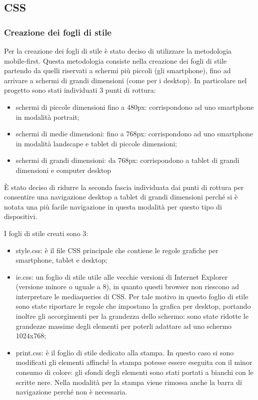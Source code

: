 \subsection{CSS}
\subsubsection{Creazione dei fogli di stile}

Per la creazione dei fogli di stile è stato deciso di utilizzare la metodologia mobile-first.
Questa metodologia consiste nella creazione dei fogli di stile partendo da quelli riservati a schermi più piccoli (gli smartphone), fino ad arrivare a schermi di grandi dimensioni (come per i desktop).
In particolare nel progetto sono stati individuati 3 punti di rottura:
\begin{itemize}

    \item schermi di piccole dimensioni fino a 480px: corrispondono ad uno smartphone in modalità portrait;
    \item schermi di medie dimensioni: fino a 768px: corrispondono ad uno smartphone in modalità landscape e tablet di piccole dimensioni;
    \item schermi di grandi dimensioni: da 768px: corrispondono a tablet di grandi dimensioni e computer desktop

\end{itemize}

\`E stato deciso di ridurre la seconda fascia individuata dai punti di rottura per consentire una navigazione desktop a tablet di grandi dimensioni perché si è notata una più facile navigazione in questa modalità per questo tipo di dispositivi.

I fogli di stile creati sono 3:
\begin{itemize}

    \item style.css: è il file CSS principale che contiene le regole grafiche per smartphone, tablet e desktop;
    \item ie.css:  un foglio di stile utile alle vecchie versioni di Internet Explorer (versione minore o uguale a 8), in quanto questi browser non riescono ad interpretare le mediaqueries di CSS. Per tale motivo in questo foglio di stile sono state riportare le regole che impostano la grafica per desktop, portando inoltre gli accorgimenti per la grandezza dello schermo: sono state ridotte le grandezze massime degli elementi per poterli adattare ad uno schermo 1024x768;
    \item print.css: è il foglio di stile dedicato alla stampa. In questo caso si sono modificati gli elementi affinché la stampa potesse essere eseguita con il minor consumo di colore: gli sfondi degli elementi sono stati portati a bianchi con le scritte nere. Nella modalità per la stampa viene rimossa anche la barra di navigazione perché non è necessaria.

\end{itemize}


